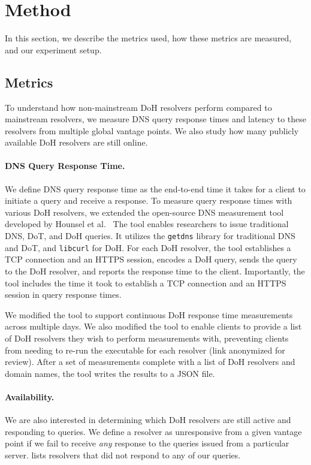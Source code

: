 \section{Method}\label{sec:method}
In this section, we describe the metrics used, how these metrics are measured, and our experiment setup.

\subsection{Metrics}
To understand how non-mainstream DoH resolvers perform compared to mainstream resolvers, we measure DNS query response times and latency to these resolvers from multiple global vantage points.
We also study how many publicly available DoH resolvers are still online.

\paragraph{DNS Query Response Time.}
We define DNS query response time as the end-to-end time it takes for a client to initiate a query and receive a response.
To measure query response times with various DoH resolvers, we extended the
open-source DNS measurement tool developed by Hounsel et al.~\cite{hounsel2020comparing}
The tool enables researchers to issue traditional DNS, DoT, and DoH queries.
It utilizes the \texttt{getdns} library for traditional DNS and DoT, and \texttt{libcurl} for DoH.
For each DoH resolver, the tool establishes a TCP connection and an HTTPS session, encodes a DoH query, sends the query to the DoH resolver, and reports the response time to the client.
Importantly, the tool includes the time it took to establish a TCP connection and an HTTPS session in query response times.

We modified the tool to support continuous DoH response time measurements across multiple days.
We also modified the tool to enable clients to provide a list of DoH resolvers
they wish to perform measurements with, preventing clients from needing to
re-run the executable for each resolver (link anonymized for review).
After a set of measurements complete with a list of DoH resolvers and domain names, the tool writes the results to a JSON file.

\paragraph{Availability.}
We are also interested in determining which DoH resolvers are still active and responding to queries.
We define a resolver as unresponsive from a given vantage point if we fail to receive \emph{any} response to the queries issued from a particular server.
 lists resolvers that did not respond to any of our queries.


